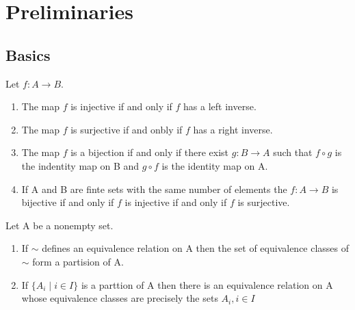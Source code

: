 \documentclass[../main]{subfiles}
\begin{document}
 
 \section{Preliminaries}
 
 \subsection{Basics}
 
 \begin{prop}
  Let $f \colon A \to B.$
  \begin{enumerate}
   \item The map $f$ is injective if and only if $f$ has a left inverse.
   \item The map $f$ is surjective if and onbly if $f$ has a right inverse.
   \item The map $f$ is a bijection if and only if there exist $g \colon B \to A$ such that $f\circ g$ is the indentity map on B and $g\circ f$ is the identity map on A.
   \item If A and B are finte sets with the same number of elements the $f\colon A \to B$ is bijective if and only if $f$ is injective if and only if $f$ is surjective.
  \end{enumerate}
 \end{prop}

 \begin{prop}
  Let A be a nonempty set.
  \begin{enumerate}
   \item If $\sim$ defines an equivalence relation on A then the set of equivalence classes of $\sim$ form a partision of A.
   \item If $\{A_i \mid i \in I\}$ is a parttion of A then there is an equivalence relation on A whose equivalence classes are precisely the sets $A_i, i\in I$
  \end{enumerate}
 \end{prop}
 
\end{document}
